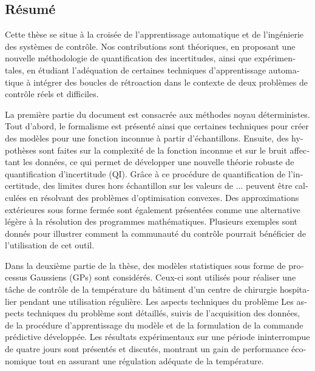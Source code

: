 %

\begin{otherlanguage}{french}
\cleardoublepage

\chapter*{Résumé}

Cette thèse se situe à la croisée de l'apprentissage automatique et de l'ingénierie des systèmes de contrôle. Nos contributions sont théoriques, en proposant une nouvelle méthodologie de quantification des incertitudes, ainsi que expérimentales, en étudiant l'adéquation de certaines techniques d'apprentissage automatique à intégrer des boucles de rétroaction dans le contexte de deux problèmes de contrôle réels et difficiles.

La première partie du document est consacrée aux méthodes noyau déterministes. Tout d'abord, le formalisme est présenté ainsi que certaines techniques pour créer des modèles pour une fonction inconnue à partir d'échantillons. Ensuite, des hypothèses sont faites sur la complexité de la fonction inconnue et sur le bruit affectant les données, ce qui permet de développer une nouvelle théorie robuste de quantification d'incertitude (QI). Grâce à ce procédure de quantification de l'incertitude, des limites dures hors échantillon sur les valeurs de ... peuvent être calculées en résolvant des problèmes d'optimisation convexes. Des approximations extérieures sous forme fermée sont également présentées comme une alternative légère à la résolution des programmes mathématiques. Plusieurs exemples sont donnés pour illustrer comment la communauté du contrôle pourrait bénéficier de l'utilisation de cet outil.

Dans la deuxième partie de la thèse, des modèles statistiques sous forme de processus Gaussiens (GPs) sont considérés. Ceux-ci sont utilisés pour réaliser une tâche de contrôle de la température du bâtiment d'un centre de chirurgie hospitalier pendant une utilisation régulière. Les aspects techniques du problème
Les aspects techniques du problème sont détaillés, suivis de l'acquisition des données, de la procédure d'apprentissage du modèle et de la formulation de la commande prédictive développée. Les résultats expérimentaux sur une période ininterrompue de quatre jours sont présentés et discutés, montrant un gain de performance économique tout en assurant une régulation adéquate de la température.


\end{otherlanguage}
